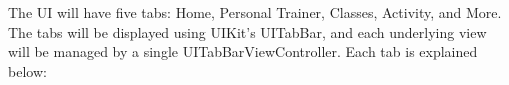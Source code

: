 \documentclass[letterpaper,10pt,titlepage]{article}
\begin{document}
The UI will have five tabs: Home, Personal Trainer, Classes, Activity, and More. The tabs will be displayed using UIKit's UITabBar, and each underlying view will be managed by a single UITabBarViewController. Each tab is explained below:\\

\end{document}
